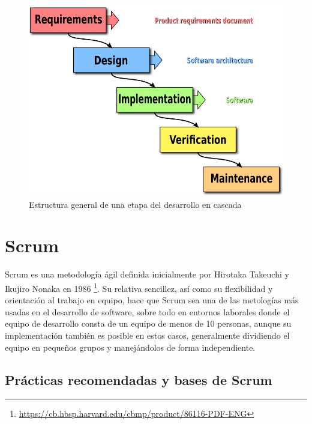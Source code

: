 \begin{figure}[H]
		\includegraphics[width=\textwidth,height=\textheight,keepaspectratio]{./img/Waterfall_model.png}
	\caption{Estructura general de una etapa del desarrollo en cascada}
	\label{fig:cascadadesarrollo}
\end{figure}

\section{Scrum}

Scrum es una metodología ágil definida inicialmente por Hirotaka Takeuchi y Ikujiro Nonaka en 1986 \footnote{\url{https://cb.hbsp.harvard.edu/cbmp/product/86116-PDF-ENG}}. Su relativa sencillez, así como su flexibilidad y orientación al trabajo en equipo, hace que Scrum sea una de las metologías más usadas en el desarrollo de software, sobre todo en entornos laborales donde el equipo de desarrollo consta de un equipo de menos de 10 personas, aunque su implementación también es posible en estos casos, generalmente dividiendo el equipo en pequeños grupos y manejándolos de forma independiente.

\subsection{Prácticas recomendadas y bases de Scrum}

